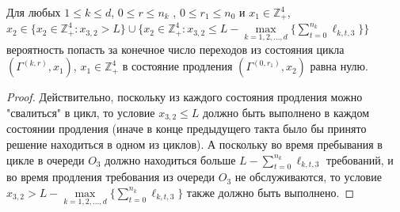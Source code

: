 \documentclass[a4paper,12pt,russian]{extarticle}
\begin{document}
\begin{lemma}
Для любых $1 \leqslant k \leqslant d$, $0 \leqslant r \leqslant n_k$ , $0 \leqslant r_1 \leqslant n_0$ и $x_1 \in \mathbb{Z}_+^4$,  $x_2 \in \{x_2 \in \mathbb{Z}_+^4 \colon x_{3,2} > L \} \cup \{x_2 \in \mathbb{Z}_+^4 \colon x_{3,2} \leqslant L -  \max\limits_{k=1, 2, \ldots, d}\{\sum_{t=0}^{n_k} \ell_{k,t,3}\} \} $ вероятность попасть за конечное число переходов из состояния цикла  $(\Gamma^{(k,r)},x_1)$, $x_1 \in \mathbb{Z}_+^4$ в состояние продления $(\Gamma^{(0,r_1)},x_2)$ равна нулю.
\label{lemma:8}
\end{lemma}
\begin{proof}
Действительно, поскольку из каждого состояния продления можно "свалиться" в цикл, то условие $x_{3,2} \leqslant L$ должно быть выполнено в каждом состоянии продления (иначе в конце предыдущего такта было бы принято решение находиться в одном из циклов). А поскольку во время пребывания в цикле в очереди $O_3$ должно находиться больше $L -  \sum_{t=0}^{n_k} \ell_{k,t,3}$ требований, и во время продления требования из очереди $O_3$ не обслуживаются, то условие $x_{3,2} > L -  \max\limits_{k=1, 2, \ldots, d}\{\sum_{t=0}^{n_k} \ell_{k,t,3}\}$ также должно быть выполнено.
\end{proof}
\end{document}

